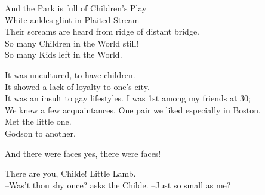\secdiv 

And the Park is full of Children's Play \\
White ankles glint in Plaited Stream \\
Their screams are heard from ridge of distant bridge. \\
So many Children in the World still! \\
So many Kids left in the World.

It was uncultured, to have children. \\
It showed a lack of loyalty to one's city. \\
It was an insult to gay lifestyles.
I was 1st among my friends at 30; \\
We knew a few acquaintances. One pair we liked especially in Boston. \\
Met the little one. \\
Godson to another.

And there were faces yes, there were faces!

There are you, Childe! Little Lamb. \\

--Was't thou shy once? asks the Childe.
--Just so small as me?